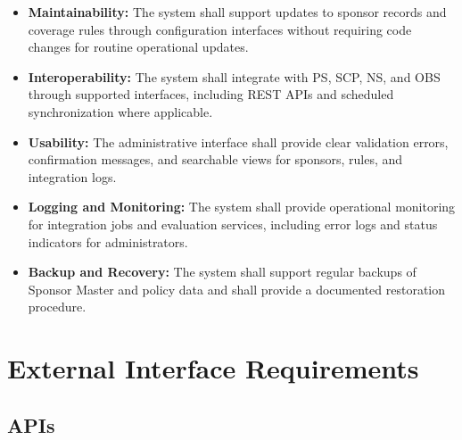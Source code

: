 \documentclass[12pt,a4paper]{article}
\begin{document}
\begin{itemize}
  \item \textbf{Maintainability:} The system shall support updates to sponsor records and coverage rules through configuration interfaces without requiring code changes for routine operational updates.
  \item \textbf{Interoperability:} The system shall integrate with PS, SCP, NS, and OBS through supported interfaces, including REST APIs and scheduled synchronization where applicable.
  \item \textbf{Usability:} The administrative interface shall provide clear validation errors, confirmation messages, and searchable views for sponsors, rules, and integration logs.
  \item \textbf{Logging and Monitoring:} The system shall provide operational monitoring for integration jobs and evaluation services, including error logs and status indicators for administrators.
  \item \textbf{Backup and Recovery:} The system shall support regular backups of Sponsor Master and policy data and shall provide a documented restoration procedure.
\end{itemize}


\section{External Interface Requirements}

\subsection{APIs}
\end{document}
